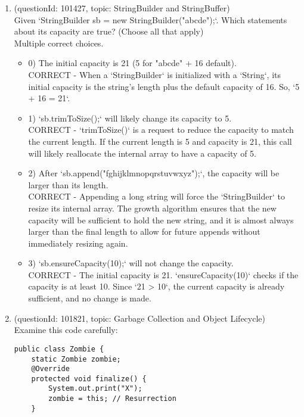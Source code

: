 \documentclass[12pt]{article}
\begin{document}
\begin{enumerate}[label=(\arabic*)]
\begin{itemize}
\end{itemize}
\item (questionId: 101427, topic: StringBuilder and StringBuffer) \\ 
Given `StringBuilder sb = new StringBuilder("abcde");`. Which statements about its capacity are true? (Choose all that apply)
\\ \noindent Multiple correct choices. 
\begin{itemize}
\item 0) The initial capacity is 21 (5 for "abcde" + 16 default).
 \\ 
CORRECT - When a `StringBuilder` is initialized with a `String`, its initial capacity is the string's length plus the default capacity of 16. So, `5 + 16 = 21`.

\item 1) `sb.trimToSize();` will likely change its capacity to 5.
 \\ 
CORRECT - `trimToSize()` is a request to reduce the capacity to match the current length. If the current length is 5 and capacity is 21, this call will likely reallocate the internal array to have a capacity of 5.

\item 2) After `sb.append("fghijklmnopqrstuvwxyz");`, the capacity will be larger than its length.
 \\ 
CORRECT - Appending a long string will force the `StringBuilder` to resize its internal array. The growth algorithm ensures that the new capacity will be sufficient to hold the new string, and it is almost always larger than the final length to allow for future appends without immediately resizing again.

\item 3) `sb.ensureCapacity(10);` will not change the capacity.
 \\ 
CORRECT - The initial capacity is 21. `ensureCapacity(10)` checks if the capacity is at least 10. Since `21 > 10`, the current capacity is already sufficient, and no change is made.

\end{itemize}
\item (questionId: 101821, topic: Garbage Collection and Object Lifecycle) \\ 
Examine this code carefully:
\begin{verbatim}
public class Zombie {
    static Zombie zombie;
    @Override
    protected void finalize() {
        System.out.print("X");
        zombie = this; // Resurrection
    }


\end{verbatim}
\end{enumerate}
\end{document}
